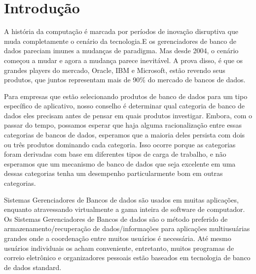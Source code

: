 \section{Introdução}
\label{sec:introducao}

A história da computação é marcada por períodos de inovação disruptiva que muda completamente o cenário da tecnologia.E os gerenciadores de banco de dados pareciam imunes a mudanças de paradigma. Mas desde 2004, o cenário começou a mudar e agora a mudança parece inevitável. A prova disso, é que os grandes players do mercado, Oracle, IBM e Microsoft, estão revendo seus produtos, que juntos representam mais de 90\% do mercado de bancos de dados.

Para empresas que estão selecionando produtos de banco de dados para um tipo específico de aplicativo, nosso conselho é determinar qual categoria de banco de dados eles precisam antes de pensar em quais produtos investigar. Embora, com o passar do tempo, possamos esperar que haja alguma racionalização entre essas categorias de bancos de dados, esperamos que a maioria deles persista com dois ou três produtos dominando cada categoria. Isso ocorre porque as categorias foram derivadas com base em diferentes tipos de carga de trabalho, e não esperamos que um mecanismo de banco de dados que seja excelente em uma dessas categorias tenha um desempenho particularmente bom em outras categorias.

Sistemas Gerenciadores de Bancos de dados são usados em muitas aplicações, enquanto atravessando virtualmente a gama inteira de software de computador. Os Sistemas Gerenciadores de Bancos de dados são o método preferido de armazenamento/recuperação de dados/informações para aplicações multiusuárias grandes onde a coordenação entre muitos usuários é necessária. Até mesmo usuários individuais os acham conveniente, entretanto, muitos programas de correio eletrônico e organizadores pessoais estão baseados em tecnologia de banco de dados standard.